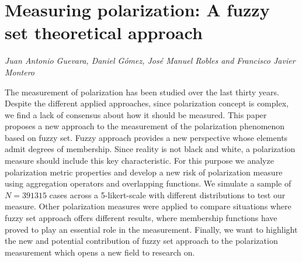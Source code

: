 \documentclass[../booklet.tex]{subfiles}
\begin{document}
\section[Measuring polarization: A fuzzy set theoretical approach. {\it Juan Antonio Guevara, Daniel Gómez, José Manuel Robles and Francisco Javier Montero}]{Measuring polarization: A fuzzy set theoretical approach}
   

\begin{center}
  {\it Juan Antonio Guevara, Daniel Gómez, José Manuel Robles and Francisco Javier Montero}
\end{center}

\vskip 0.8cm


The measurement of polarization has been studied over the last thirty years. Despite the different applied approaches, since polarization concept is complex, we find a lack of consensus about how it should be measured. This paper proposes a new approach to the measurement of the polarization phenomenon based on fuzzy set. Fuzzy approach provides a new perspective whose elements admit degrees of membership. Since reality is not black and white, a polarization measure should include this key characteristic. For this purpose we analyze polarization metric properties and develop a new risk of polarization measure using aggregation operators and overlapping functions. We simulate a sample of $N = 391315$ cases across a 5-likert-scale with different distributions to test our measure. Other polarization measures were applied to compare situations where fuzzy set approach offers different results, where membership functions have proved to play an essential role in the measurement. Finally, we want to highlight the new and potential contribution of fuzzy set approach to the polarization measurement which opens a new field to research on.
\end{document}
